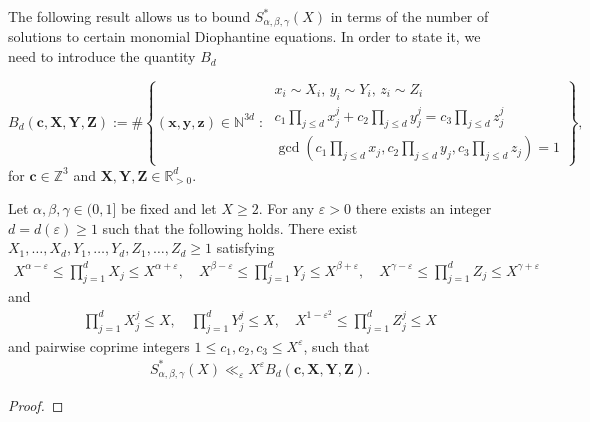 The following result allows us to bound $S^*_{\alpha,\beta,\gamma}(X)$
in terms of the number of solutions to certain monomial Diophantine equations. In order to state it, we need to introduce the quantity $B_d$
\begin{definition}\label{def:BdDiophantineCount}
\begin{equation}\label{eq:Bk}
B_d(\mathbf{c},\mathbf{X},\mathbf{Y},\mathbf{Z}) := \#\left\{(\mathbf{x},\mathbf{y},\mathbf{z})\in \mathbb{N}^{3d}\;:\;
\begin{array}{l}
x_i\sim X_i,\,y_i\sim Y_i,\,z_i\sim Z_i \\
c_1\prod_{j\leq d}x_j^j+c_2\prod_{j\leq d}y_j^j=c_3\prod_{j\leq d}z_j^j\\
\gcd(c_1\prod_{j\leq d}x_j,c_2\prod_{j\leq d}y_j ,
c_3\prod_{j\leq d}z_j)=1
\end{array}
\right\},
\end{equation}
for $\mathbf{c}\in \mathbb{Z}^3$ and $\mathbf{X},\mathbf{Y},\mathbf{Z}\in \mathbb{R}_{>0}^{d}$.
\end{definition}




\begin{proposition}\label{prop:DiophantineReduction}
Let $\alpha,\beta,\gamma\in (0,1]$ be fixed and let $X\geq 2$. For any $\varepsilon>0$ there exists an integer $d=d(\varepsilon)\geq 1$ such that the following holds.
There exist $X_1,\ldots, X_d,Y_1,\ldots, Y_d, Z_1,\ldots, Z_d\geq 1$ satisfying
\begin{align}\label{eq:xiyizi_1}
X^{\alpha-\varepsilon}\leq \prod_{j=1}^{d}X_j\leq X^{\alpha+\varepsilon},\quad
X^{\beta-\varepsilon}\leq\prod_{j=1}^{d}Y_j\leq X^{\beta+\varepsilon},\quad
X^{\gamma-\varepsilon}\leq\prod_{j=1}^{d}Z_j\leq X^{\gamma+\varepsilon}
\end{align}
and
\begin{align}\label{eq:xiyizi_2}
\prod_{j=1}^d X_j^j \leq X, \quad \prod_{j=1}^d Y_j^j\leq X,\quad X^{1-\varepsilon^2}\leq \prod_{j=1}^d Z_j^j\leq X
\end{align}
and pairwise coprime integers $1\leq c_1,c_2,c_3\leq X^{\varepsilon}$, such that
\begin{align*}
S^*_{\alpha,\beta,\gamma}(X) \ll_{\varepsilon} X^{\varepsilon}B_d(\mathbf{c},\mathbf{X},\mathbf{Y},\mathbf{Z}).
\end{align*}
\end{proposition}
\begin{proof}
\end{proof}


